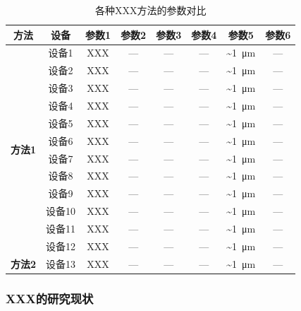 \documentclass[UTF8,12pt,AutoFakeBold=2]{ctexart}
\begin{document}
\begin{table}
	\caption{\label{tab:comparison}各种XXX方法的参数对比}
	\centering
	\begin{tabular}{cccccccc}
		\toprule
		\textbf{方法}	&	\textbf{设备}	&	\textbf{参数1}	&	\textbf{参数2}	&	\textbf{参数3}	&	\textbf{参数4} 	&	\textbf{参数5}	&	\textbf{参数6} \\
		\midrule
		\multirow{12}{*}{\textbf{方法1}} & 设备1\cite{iijima1991helical} & XXX & --- & --- & --- & \textasciitilde\SI{1}{\um} & --- \\
		& 设备2\cite{lowry1951protein} & XXX & --- & --- & --- & \textasciitilde\SI{1}{\um} & --- \\
		& 设备3\cite{bradford1976rapid, einstein1935can, randall1999alternative} & XXX & --- & --- & --- & \textasciitilde\SI{1}{\um} & --- \\
		& 设备4\cite{laemmli1970cleavage} & XXX & --- & --- & --- & \textasciitilde\SI{1}{\um} & --- \\
		& 设备5\cite{maldacena1999large} & XXX & --- & --- & --- & \textasciitilde\SI{1}{\um} & --- \\
		& 设备6\cite{gubser1998gauge} & XXX & --- & --- & --- & \textasciitilde\SI{1}{\um} & --- \\
		& 设备7\cite{randall1999alternative} & XXX & --- & --- & --- & \textasciitilde\SI{1}{\um} & --- \\
		& 设备8\cite{aharony2000large} & XXX & --- & --- & --- & \textasciitilde\SI{1}{\um} & --- \\
		& 设备9\cite{copeland2006dynamics} & XXX & --- & --- & --- & \textasciitilde\SI{1}{\um} & --- \\
		& 设备10\cite{susskind1995world} & XXX & --- & --- & --- & \textasciitilde\SI{1}{\um} & --- \\
		& 设备11\cite{kitaev2003fault} & XXX & --- & --- & --- & \textasciitilde\SI{1}{\um} & --- \\
		& 设备12\cite{breiman2001random} & XXX & --- & --- & --- & \textasciitilde\SI{1}{\um} & --- \\
		\textbf{方法2} & 设备13\cite{pedregosa2011scikit} & XXX & --- & --- & --- & \textasciitilde\SI{1}{\um} & --- \\
		\bottomrule
	\end{tabular}
\end{table}



\subsubsection{XXX的研究现状}
\end{document}
